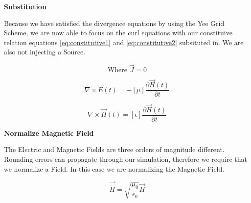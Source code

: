 \documentclass[a4paper,10pt]{article}
\begin{document}
\textbf{Substitution}

Because we have satisfied the divergence equations by using the Yee Grid Scheme, we are now able to focus on the curl equations with our constituive relation equations \eqref{eq:constitutive1} and \eqref{eq:constitutive2} subsituted in.  We are also not injecting a Source.

\begin{equation*}
 \mbox{Where }\vec{J} = 0
\end{equation*}


\begin{equation}
  \nabla \times \vec{E}(t) = -[\mu]\frac{\partial \vec{H}(t)}{\partial t}
\end{equation}


\begin{equation}
   \nabla \times \vec{H}(t) = [\epsilon]\frac{\partial\vec{H}(t)}{\partial t}
\end{equation}


\textbf{Normalize Magnetic Field}

The Electric and Magnetic Fields are three orders of magnitude different.  Rounding errors can propagate through our simulation, therefore we require that we normalize a Field.  In this case we are normalizing the Magnetic Field.

\begin{equation}
  \vec{\tilde{H}} = \sqrt{\frac{\mu_0}{\epsilon_0}}\vec{H}
\end{equation}
\end{document}
